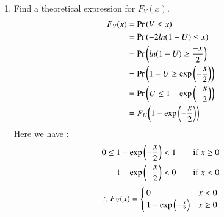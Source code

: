 \documentclass[journal,12pt,twocolumn]{IEEEtran}
\renewcommand\thesection{\arabic{section}}
\begin{document}
\begin{enumerate}[label=\thesection.\arabic*
,ref=\thesection.\theenumi]
\begin{figure}[!htbp]
\caption{The CDF of $U$}
\label{fig:V_cdf}
\end{figure}
\item Find a theoretical expression for $F_V(x)$.\\
\solution
\begin{align}
F_V(x) & = \Pr\left(V \leq x\right)\\& = \Pr\left(-2ln(1-U) \leq x\right)\\& = \Pr\left(ln(1-U) \geq \frac{-x}{2}\right)\\& = \Pr\left(1-U \geq \exp\left(-\frac{x}{2}\right)\right)\\& = \Pr\left(U \leq 1-\exp\left(-\frac{x}{2}\right)\right)\\& = F_U{\left(1-\exp\left(-\frac{x}{2}\right)\right)}
\end{align}
Here we have :\\
\begin{align}
0 \le 1-\exp\left(-\frac{x}{2}\right) &< 1 \qquad \text{if } x \ge 0	\\	
		1-\exp\left(-\frac{x}{2}\right) &< 0 \qquad \text{if } x < 0	
\end{align}
\begin{align}
\therefore F_V(x) = 
		\begin{cases}
			0 & x < 0\\
			1-\exp\left(-\frac{x}{2}\right) & x \geq 0 
		\end{cases}
\end{align}
%
\end{enumerate}
\end{document}
